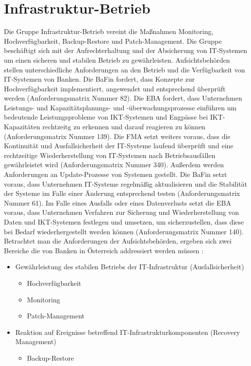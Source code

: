 \section{Infrastruktur-Betrieb}
\label{Patch-Management}
Die Gruppe \glqq{}Infrastruktur-Betrieb\grqq{} vereint die Maßnahmen \glqq{}Monitoring\grqq{}, \glqq{}Hochverfügbarkeit\grqq{}, \glqq{}Backup-Restore\grqq{} und \glqq{}Patch-Management\grqq{}. Die Gruppe beschäftigt sich mit der Aufrechterhaltung und der Absicherung von IT-Systemen um einen sicheren und stabilen Betrieb zu gewährleisten. 
Aufsichtsbehörden stellen unterschiedliche Anforderungen an den Betrieb und die Verfügbarkeit von IT-Systemen von Banken. Die BaFin fordert, dass Konzepte zur Hochverfügbarkeit implementiert, angewendet und entsprechend überprüft werden (Anforderungsmatrix Nummer 82). Die EBA fordert, dass Unternehmen Leistungs- und Kapazitätsplanungs- und -überwachungsprozesse einführen um bedeutende Leistungsprobleme von IKT-Systemen und Engpässe bei IKT-Kapazitäten rechtzeitg zu erkennen und darauf reagieren zu können (Anforderungsmatrix Nummer 139). Die FMA setzt weiters voraus, dass die Kontinuität und Ausfallsicherheit der IT-Systeme laufend überprüft und eine rechtzeitige Wiederherstellung von IT-Systemen nach Betriebsausfällen gewährleistet wird (Anforderungsmatrix Nummer 340). Außerdem werden Anforderungen an Update-Prozesse von Systemen gestellt. Die BaFin setzt voraus, dass Unternehmen IT-Systeme regelmäßig aktualisieren und die Stabilität der Systeme im Falle einer Änderung entsprechend testen (Anforderungsmatrix Nummer 61). Im Falle eines Ausfalls oder eines Datenverlusts setzt die EBA voraus, dass Unternehmen Verfahren zur Sicherung und Wiederherstellung von Daten und IKT-Systemen festlegen und umsetzen, um sicherzustellen, dass diese bei Bedarf wiederhergestellt werden können (Anforderungsmatrix Nummer 140). 
\bigbreak
Betrachtet man die Anforderungen der Aufsichtsbehörden, ergeben sich zwei Bereiche die von Banken in Österreich addressiert werden müssen \autocite{kharod_2021}:
\begin{itemize}
    \item Gewährleistung des stabilen Betriebs der IT-Infrastruktur (Ausfallsicherheit)
    \begin{itemize}
        \item Hochverfügbarkeit
        \item Monitoring
        \item Patch-Management
    \end{itemize}
    \item Reaktion auf Ereignisse betreffend IT-Infrastrukturkomponenten (Recovery Management)
    \begin{itemize}
        \item Backup-Restore
    \end{itemize}
\end{itemize}

